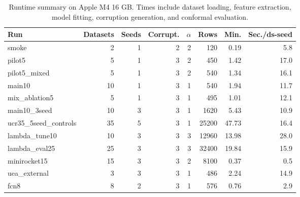 \begin{table}[t]
\centering
\small
\caption{Runtime summary on Apple M4 16 GB. Times include dataset loading, feature extraction, model fitting, corruption generation, and conformal evaluation.}
\label{tab:runtime_summary}
\begin{tabular}{lrrrrrrr}
\toprule
Run & Datasets & Seeds & Corrupt. & $\alpha$ & Rows & Min. & Sec./ds-seed \\
\midrule
smoke & 2 & 1 & 2 & 2 & 120 & 0.19 & 5.8 \\
pilot5 & 5 & 1 & 3 & 2 & 450 & 1.42 & 17.0 \\
pilot5\_mixed & 5 & 1 & 3 & 2 & 540 & 1.34 & 16.1 \\
main10 & 10 & 1 & 3 & 1 & 540 & 1.94 & 11.7 \\
mix\_ablation5 & 5 & 1 & 3 & 1 & 495 & 1.01 & 12.1 \\
main10\_3seed & 10 & 3 & 3 & 1 & 1620 & 5.43 & 10.9 \\
ucr35\_5seed\_controls & 35 & 5 & 3 & 1 & 25200 & 47.73 & 16.4 \\
lambda\_tune10 & 10 & 3 & 3 & 3 & 12960 & 13.98 & 28.0 \\
lambda\_eval25 & 25 & 3 & 3 & 3 & 32400 & 19.84 & 15.9 \\
minirocket15 & 15 & 3 & 3 & 2 & 8100 & 0.37 & 0.5 \\
uea\_external & 3 & 3 & 3 & 1 & 486 & 2.24 & 14.9 \\
fcn8 & 8 & 2 & 3 & 1 & 576 & 0.76 & 2.9 \\
\bottomrule
\end{tabular}
\end{table}
